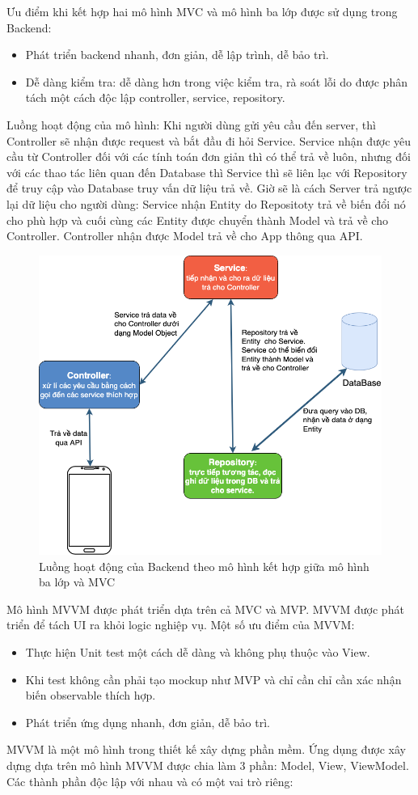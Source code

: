 \documentclass[../Main.tex]{subfiles}
\begin{document}
Ưu điểm khi kết hợp hai mô hình MVC và mô hình ba lớp được sử dụng trong Backend:
\begin{itemize}
    \item Phát triển backend nhanh, đơn giản, dễ lập trình, dễ bảo trì.
    \item Dễ dàng kiểm tra: dễ dàng hơn trong việc kiểm tra, rà soát lỗi do được phân tách một cách độc lập controller, service, repository.
\end{itemize}
Luồng hoạt động của mô hình: Khi người dùng gửi yêu cầu đến server, thì Controller sẽ nhận được request và bắt đầu đi hỏi Service. Service nhận được yêu cầu từ Controller đối với các tính toán đơn giản thì có thể trả về luôn, nhưng đối với  các thao tác liên quan đến Database thì Service thì sẽ liên lạc với Repository để truy cập vào Database truy vấn dữ liệu trả về. Giờ sẽ là cách Server trả ngược lại dữ liệu cho người dùng: Service nhận Entity do Repositoty trả về biến đổi nó cho phù hợp và cuối cùng các Entity được chuyển thành Model và trả về cho Controller. Controller nhận được Model trả về cho App thông qua API.
\newpage
\begin{figure}[H]
    \centering
    \includegraphics[width=0.75\linewidth]{Figure/backend_architechture.png}
    \caption{Luồng hoạt động của Backend theo mô hình kết hợp giữa mô hình ba lớp và MVC}
    \label{fig:use_case_tổng_quan}
\end{figure}
Mô hình MVVM được phát triển dựa trên cả MVC và MVP. MVVM được phát triển để tách UI ra khỏi logic nghiệp vụ. Một số ưu điểm của MVVM:
\begin{itemize}
 \item Thực hiện Unit test một cách dễ dàng và không phụ thuộc vào View.
 \item Khi test không cần phải tạo mockup như MVP và chỉ cần chỉ cần xác nhận biến observable thích hợp.
 \item Phát triển ứng dụng nhanh, đơn giản, dễ bảo trì.
\end{itemize}
MVVM là một mô hình trong thiết kế xây dựng phần mềm. Ứng dụng được xây dựng dựa trên mô hình MVVM được chia làm 3 phần: Model, View, ViewModel. Các thành phần độc lập với nhau và có một vai trò riêng: 
\end{document}

